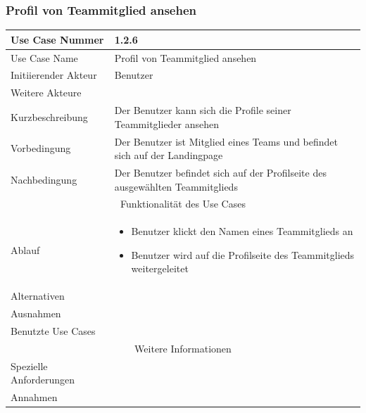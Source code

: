 \documentclass[10pt,a4paper]{article}
\begin{document}
		\subsubsection{Profil von Teammitglied ansehen}
		\begin{tabularx}{\textwidth}{|l|X|}
			\hline Use Case Nummer & 1.2.6 \\ 
			\hline Use Case Name & Profil von Teammitglied ansehen \\ 
			\hline Initiierender Akteur & Benutzer \\
			\hline Weitere Akteure & \\
			\hline Kurzbeschreibung & Der Benutzer kann sich die Profile seiner Teammitglieder ansehen \\
			\hline Vorbedingung & Der Benutzer ist Mitglied eines Teams und befindet sich auf der Landingpage \\
			\hline Nachbedingung & Der Benutzer befindet sich auf der Profilseite des ausgewählten Teammitglieds \\
			\hline \multicolumn{2}{|c|}{Funktionalität des Use Cases}\\
			\hline Ablauf & \begin{itemize}
				\item Benutzer klickt den Namen eines Teammitglieds an
				\item Benutzer wird auf die Profilseite des Teammitglieds weitergeleitet
			\end{itemize} \\
			\hline Alternativen & \\
			\hline Ausnahmen & \\
			\hline Benutzte Use Cases & \\
			\hline \multicolumn{2}{|c|}{Weitere Informationen} \\
			\hline Spezielle Anforderungen & \\
			\hline Annahmen & \\
			\hline
		\end{tabularx}
					
\end{document}
